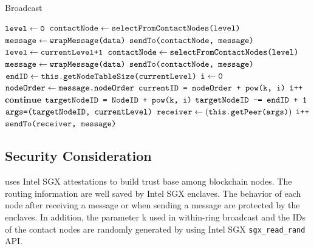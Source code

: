 \begin{algorithm}[t]
	\caption{Broadcast}\label{euclid}
	\begin{algorithmic}[1]
		\State $\texttt{level} \gets \texttt{0}$
		\State $\texttt{contactNode} \gets \texttt{selectFromContactNodes(level)}$
		\State $\texttt{message} \gets \texttt{wrapMessage(data)}$
		\State $\texttt{sendTo(contactNode, message)}$
		\EndFunction
		\\
		\State $\texttt{level} \gets \texttt{currentLevel+1}$
		\State $\texttt{contactNode} \gets \texttt{selectFromContactNodes(level)}$
		\State $\texttt{message} \gets \texttt{wrapMessage(data)}$
		\State $\texttt{sendTo(contactNode, message)}$
		\EndFunction
		\\
		\State $\texttt{endID} \gets \texttt{this.getNodeTableSize(currentLevel)}$
		\State $\texttt{i} \gets \texttt{0}$
		\State $\texttt{nodeOrder} \gets \texttt{message.nodeOrder}$
		\State $\texttt{currentID = nodeOrder + pow(k, i)}$
			\State $\texttt{i++}$
			\State $\textbf{continue}$
			\Else
			\State $\texttt{targetNodeID = NodeID + pow(k, i)}$
			\State $\texttt{targetNodeID -= endID + 1}$
			\EndIf
			\State $\texttt{args=(targetNodeID, currentLevel)}$
			\State $\texttt{receiver} \gets (\texttt{this.getPeer(args)})$
			\State $\texttt{i++}$
			\State $\texttt{sendTo(receiver, message)}$
			\EndIf
		\EndWhile
		\EndFunction
	\end{algorithmic}
\end{algorithm}

\subsection{Security Consideration} \label{security}

\xxx uses Intel SGX attestations to build trust base among blockchain nodes. The routing information are well saved by Intel SGX enclaves. The behavior of each node after receiving a message or when sending a message are protected by the enclaves. In addition, the parameter k used in within-ring broadcast and the IDs of the contact nodes are randomly generated by using Intel SGX \texttt{sgx\_read\_rand} API.

